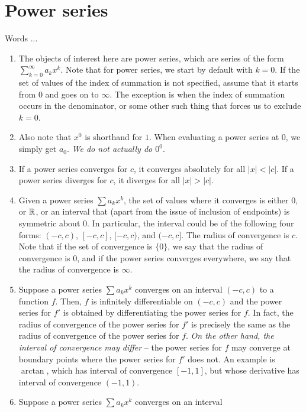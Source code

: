 \documentclass[10pt]{amsart}
\begin{document}
\section{Power series}

Words ...

\begin{enumerate}
\item The objects of interest here are power series, which are series
  of the form $\sum_{k=0}^\infty a_kx^k$. Note that for power series,
  we start by default with $k = 0$. If the set of values of the index
  of summation is not specified, assume that it starts from $0$ and
  goes on to $\infty$. The exception is when the index of summation
  occurs in the denominator, or some other such thing that forces us
  to exclude $k = 0$.
\item Also note that $x^0$ is shorthand for $1$. When
  evaluating a power series at $0$, we simply get $a_0$. {\em We do
  not actually do $0^0$}.
\item If a power series converges for $c$, it converges absolutely for
  all $|x| < |c|$. If a power series diverges for $c$, it diverges for
  all $|x| > |c|$.
\item Given a power series $\sum a_kx^k$, the set of values where it
  converges is either $0$, or $\mathbb{R}$, or an interval that (apart from
  the issue of inclusion of endpoints) is symmetric about $0$. In
  particular, the interval could be of the following four forms:
  $(-c,c)$, $[-c,c]$, $[-c,c)$, and $(-c,c]$. The radius of
  convergence is $c$. Note that if the set of convergence is $\{ 0
  \}$, we say that the radius of convergence is $0$, and if the power
  series converges everywhere, we say that the radius of convergence
  is $\infty$.
\item Suppose a power series $\sum a_kx^k$ converges on an interval
  $(-c,c)$ to a function $f$. Then, $f$ is infinitely differentiable
  on $(-c,c)$ and the power series for $f'$ is obtained by
  differentiating the power series for $f$. In fact, the radius of
  convergence of the power series for $f'$ is precisely the same as
  the radius of convergence of the power series for $f$. {\em On the
  other hand, the interval of convergence may differ} -- the power
  series for $f$ may converge at boundary points where the power
  series for $f'$ does not. An example is $\arctan$, which has
  interval of convergence $[-1,1]$, but whose derivative has interval
  of convergence $(-1,1)$.
\item Suppose a power series $\sum a_kx^k$ converges on an interval

\end{enumerate}
\end{document}
